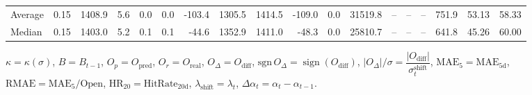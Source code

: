 \begin{threeparttable}
{\begin{tabular}{lrrrrrrrrrrrrrrrrr}
Average &     0.15 & 1408.9 &               5.6 &               0.0 &                0.0 &             -103.4 &  1305.5 & 1414.5 &     -109.0 &                      0.0 &             31519.8 &         -- &        -- &             -- &            751.9 &           53.13 &                  58.33 \\
 Median &     0.15 & 1403.0 &               5.2 &               0.1 &                0.1 &              -44.6 &  1352.9 & 1411.0 &      -48.3 &                      0.0 &             25810.7 &         -- &        -- &             -- &            641.8 &           45.26 &                  60.00 \\
\bottomrule
\end{tabular}
}
\begin{tablenotes}\footnotesize
\item $\kappa=\kappa(\sigma)$, $B=B_{t-1}$, $O_p=O_{\text{pred}}$, $O_r=O_{\text{real}}$, $O_\Delta=O_{\text{diff}}$, $\mathrm{sgn}\,O_\Delta=\operatorname{sign}(O_{\text{diff}})$, $|O_\Delta|/\sigma=\dfrac{|O_{\text{diff}}|}{\sigma_t^{\text{shift}}}$, $\mathrm{MAE}_5=\mathrm{MAE}_{5\text{d}}$, $\mathrm{RMAE}= \mathrm{MAE}_5 / \text{Open}$, $\mathrm{HR}_{20}=\mathrm{HitRate}_{20\text{d}}$, 
$\lambda_{\text{shift}}=\lambda_t$, 
$\Delta\alpha_t=\alpha_t-\alpha_{t-1}$.
\end{tablenotes}
\end{threeparttable}
\endgroup

